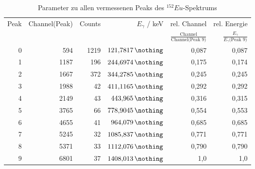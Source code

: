 \begin{table}[h!]
  \centering
  \caption{Parameter zu allen vermessenen Peaks des $^{152}Eu$-Spektrums}
  \label{tab:EU-Peaks}
  \begin{tabular}{ r  r  r  r  r  r  }
    \bottomrule
            Peak & Channel(Peak)  & Counts  &  $E_{\gamma}$ / keV \cite{nucleide} & rel. Channel                                       & rel. Energie  \\ %
                 &                &         &                                     & $\frac{\text{Channel}}{\text{Channel(Peak 9)}}$    & $\frac{E_{\gamma}}{E_{\gamma}\text{(Peak 9)}}$ \\ %
    \midrule
            0    &  594           &  1219   &  $\SI{121.7817}{\nothing}$          & 0,087                                              & 0,087 \\
            1    &  1187          &  196    &  $\SI{244.6974}{\nothing}$          & 0,175                                              & 0,174 \\
            2    &  1667          &  372    &  $\SI{344.2785}{\nothing}$          & 0,245                                              & 0,245 \\
            3    &  1988          &  42     &  $\SI{411.1165}{\nothing}$          & 0,292                                              & 0,292 \\
            4    &  2149          &  43     &  $\SI{ 443.965}{\nothing}$          & 0,316                                              & 0,315 \\
            5    &  3765          &  66     &  $\SI{778.9045}{\nothing}$          & 0,554                                              & 0,553 \\
            6    &  4655          &  41     &  $\SI{ 964.079}{\nothing}$          & 0,685                                              & 0,685 \\
            7    &  5245          &  32     &  $\SI{1085.837}{\nothing}$          & 0,771                                              & 0,771 \\
            8    &  5371          &  33     &  $\SI{1112.076}{\nothing}$          & 0,790                                              & 0,790 \\
            9    &  6801          &  37     &  $\SI{1408.013}{\nothing}$          & 1,0                                                & 1,0 \\
    \toprule
  \end{tabular}
\end{table}
